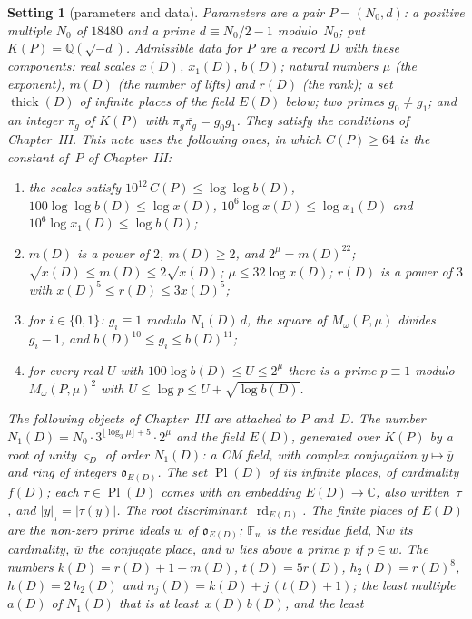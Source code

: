\documentclass[11pt,a4paper]{article}
\newcommand{\kw}[1]{\emph{#1}}
\newcommand{\m}[1]{\mbox{$#1$}}        %
\theoremstyle{plainx}
\theoremstyle{uprightx}
\newtheorem{setting}[theorem]{Setting}          %
\newcommand{\OO}{\mathfrak{o}}
\newcommand{\CC}{\mathbb{C}}
\newcommand{\QQ}{\mathbb{Q}}
\newcommand{\FF}{\mathbb{F}}
\newcommand{\cj}[1]{\overline{#1}}
\newcommand{\Nm}{\mathrm{N}}                       %
\newcommand{\KP}[1]{K(#1)}
\newcommand{\cP}[1]{C(#1)}
\newcommand{\ED}[1]{E(#1)}
\newcommand{\None}[1]{N_1(#1)}
\newcommand{\fD}[1]{f(#1)}
\newcommand{\xD}[1]{x(#1)}
\newcommand{\xoD}[1]{x_1(#1)}
\newcommand{\bD}[1]{b(#1)}
\newcommand{\mD}[1]{m(#1)}
\newcommand{\rD}[1]{r(#1)}
\newcommand{\kD}[1]{k(#1)}
\newcommand{\tD}[1]{t(#1)}
\newcommand{\aD}[1]{a(#1)}
\newcommand{\hD}[1]{h(#1)}
\newcommand{\hhD}[1]{h_2(#1)}
\newcommand{\nD}[2]{n_{#2}(#1)}
\newcommand{\thick}[1]{\operatorname{thick}(#1)}
\newcommand{\rdD}[1]{\operatorname{rd}_{\ED{#1}}}
\newcommand{\PlD}[1]{\operatorname{Pl}(#1)}
\newcommand{\Mom}[2]{M_\omega(#1,#2)}
\newcommand{\rtu}[1]{\varsigma_{#1}}               %
\begin{document}
\begin{setting}[parameters and data]\label{set:data}
\kw{Parameters} are a pair $P=(N_0,d)$: a positive multiple $N_0$ of $18480$ and a prime $d\equiv N_0/2-1$
modulo~$N_0$; put $\KP{P}=\QQ(\sqrt{-d})$. \kw{Admissible data} for $P$ are a record $D$ with these components: real
scales $\xD{D}$, $\xoD{D}$, $\bD{D}$; natural numbers $\mu$ (the exponent), $\mD{D}$ (the number of lifts) and $\rD{D}$ (the rank); a set
$\thick{D}$ of infinite places of the field $\ED{D}$ below; two primes $g_0\ne g_1$; and an integer $\pi_g$ of $\KP{P}$
with \m{\pi_g\cj{\pi_g}=g_0g_1}. They satisfy the conditions of Chapter~III. This note uses the following ones, in
which $\cP{P}\ge64$ is the constant of~$P$ of Chapter~III:
\begin{enumerate}[label=(D\arabic*)]
\item the scales satisfy $10^{12}\,\cP{P}\le\log\log \bD{D}$, $100\log\log \bD{D}\le\log \xD{D}$, $10^6\log \xD{D}\le\log \xoD{D}$ and
$10^6\log \xoD{D}\le\log \bD{D}$;
\item $\mD{D}$ is a power of $2$, $\mD{D}\ge2$, and $2^\mu=\mD{D}^{22}$;
$\sqrt{\xD{D}}\le \mD{D}\le2\sqrt{\xD{D}}$; $\mu\le32\log \xD{D}$; $\rD{D}$ is a power of $3$ with $\xD{D}^5\le \rD{D}\le3\xD{D}^5$;
\item for $i\in\{0,1\}$: \m{g_i\equiv1} modulo $\None{D}\,d$, the square of $\Mom{P}{\mu}$ divides $g_i-1$, and
\m{\bD{D}^{10}\le g_i\le \bD{D}^{11}};
\item for every real $U$ with \m{100\log \bD{D}\le U\le2^\mu} there is a prime $p\equiv1$ modulo $\Mom{P}{\mu}^2$ with
\m{U\le\log p\le U+\sqrt{\log \bD{D}}}.
\end{enumerate}
The following objects of Chapter~III are attached to $P$ and~$D$. The number
$\None{D}=N_0\cdot3^{\lfloor\log_3\mu\rfloor+5}\cdot2^{\mu}$ and the field $\ED{D}$, generated over $\KP{P}$ by a
root of unity $\rtu{D}$ of order $\None{D}$: a CM field, with complex conjugation $y\mapsto\cj{y}$ and ring of
integers $\OO_{\ED{D}}$. The set $\PlD{D}$ of its infinite places, of cardinality $\fD{D}$; each $\tau\in\PlD{D}$
comes with an embedding \m{\ED{D}\to\CC}, also written~$\tau$, and \m{|y|_\tau=|\tau(y)|}. The root
discriminant~$\rdD{D}$. The finite places of $\ED{D}$ are the non-zero prime ideals $w$ of $\OO_{\ED{D}}$; $\FF_w$ is
the residue field, $\Nm w$ its cardinality, $\cj{w}$ the conjugate place, and $w$ \kw{lies above} a prime $p$ if
$p\in w$. The numbers \m{\kD{D}=\rD{D}+1-\mD{D}}, \m{\tD{D}=5\rD{D}}, \m{\hhD{D}=\rD{D}^8}, \m{\hD{D}=2\,\hhD{D}} and
\m{\nD{D}{j}=\kD{D}+j\,(\tD{D}+1)}; the least multiple $\aD{D}$ of $\None{D}$ that is at least~$\xD{D}\,\bD{D}$, and the least

\end{setting}
\end{document}
